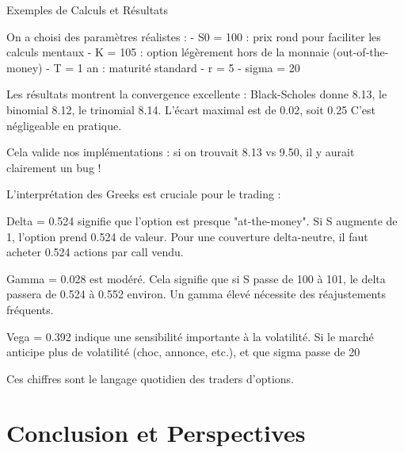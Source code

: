 \documentclass[aspectratio=169, 10pt]{beamer}
\begin{document}
\begin{frame}{Exemples de Calculs et Résultats}
{        On a choisi des paramètres réalistes :
        - S0 = 100 : prix rond pour faciliter les calculs mentaux
        - K = 105 : option légèrement hors de la monnaie (out-of-the-money)
        - T = 1 an : maturité standard
        - r = 5%
        - sigma = 20%
        
        Les résultats montrent la convergence excellente :
        Black-Scholes donne 8.13, le binomial 8.12, le trinomial 8.14.
        L'écart maximal est de 0.02, soit 0.25%
        C'est négligeable en pratique.
        
        Cela valide nos implémentations : si on trouvait 8.13 vs 9.50,
        il y aurait clairement un bug !
        
        L'interprétation des Greeks est cruciale pour le trading :
        
        Delta = 0.524 signifie que l'option est presque "at-the-money".
        Si S augmente de 1, l'option prend 0.524 de valeur.
        Pour une couverture delta-neutre, il faut acheter 0.524 actions par call vendu.
        
        Gamma = 0.028 est modéré. Cela signifie que si S passe de 100 à 101,
        le delta passera de 0.524 à 0.552 environ.
        Un gamma élevé nécessite des réajustements fréquents.
        
        Vega = 0.392 indique une sensibilité importante à la volatilité.
        Si le marché anticipe plus de volatilité (choc, annonce, etc.),
        et que sigma passe de 20%
        
        Ces chiffres sont le langage quotidien des traders d'options.
    }
\end{frame}

\section{Conclusion et Perspectives}
\end{document}
